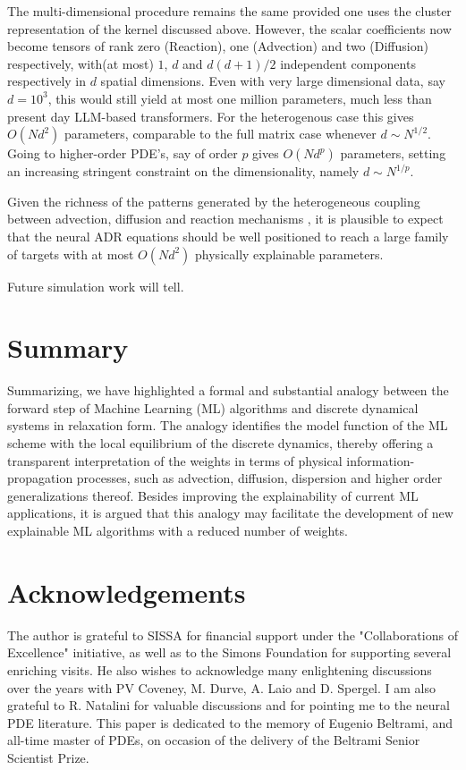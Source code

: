 \documentclass[15pt]{article}
\begin{document}
The multi-dimensional procedure remains the same provided one uses 
the cluster representation of the kernel discussed above.
However, the scalar coefficients now become tensors of rank zero 
(Reaction), one (Advection) and two (Diffusion) 
respectively, with(at most) $1$, $d$ and $d(d+1)/2$ independent components 
respectively in $d$ spatial dimensions.
Even with very large dimensional data, say $d=10^3$, this would still
yield at most one million parameters, much less than present day LLM-based
transformers. For the heterogenous case this gives $O(Nd^2)$ parameters,
comparable to the full matrix case whenever $d \sim N^{1/2}$.
Going to higher-order PDE's, say of order $p$ gives $O(Nd^p)$ parameters,
setting an increasing stringent constraint on the dimensionality, namely
$d \sim N^{1/p}$. 

Given the richness of the patterns generated by the heterogeneous coupling between 
advection, diffusion and reaction mechanisms \cite{NELSON}, it is plausible to 
expect that the neural ADR equations should be well positioned 
to reach a large family of targets with at most $O(Nd^2)$ physically 
explainable parameters.

Future simulation work will tell. 

\section{Summary}

Summarizing, we have highlighted a formal and substantial analogy 
between the forward step of Machine Learning (ML) algorithms and 
discrete dynamical systems in relaxation form.
The analogy identifies the model function of the ML
scheme with the local equilibrium of the discrete
dynamics, thereby offering a transparent interpretation 
of the weights in terms of physical information-propagation processes,
such as advection, diffusion, dispersion and higher order generalizations thereof.
Besides improving the explainability of current ML applications, it is
argued that this analogy may facilitate the development of new explainable ML 
algorithms with a reduced number of weights.

\section{Acknowledgements}

The author is grateful to SISSA for financial support under the
"Collaborations of Excellence" initiative, as well as 
to the Simons Foundation for supporting several enriching visits.
He also wishes to acknowledge many enlightening discussions 
over the years with PV Coveney, M. Durve, A. Laio and D. Spergel.
I am also grateful to R. Natalini for valuable discussions and 
for pointing me to the neural PDE literature.
This paper is dedicated to the memory of Eugenio Beltrami, and all-time master 
of PDEs, on occasion of the delivery of the Beltrami Senior Scientist Prize.


\end{document}
